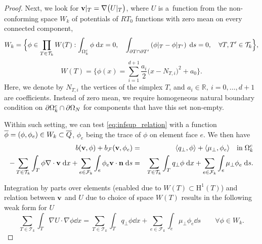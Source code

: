 {\begin{proof}
Next, we look for $\mathbf{v}|_T = \nabla \big(U|_T\big)$, where $U$ is a~function  
from the non-conforming space $W_k$ of potentials of $RT_{0}$ functions with 
zero mean on every connected component,
\begin{equation*}
  W_k =\Big\{\phi\in \prod_{T\in \mathcal{T}_k} W(T) : 
    \int_{\Omega^c_k} \phi \; \mathrm{d} x =0,\quad
    \int_{\partial T \cap \partial T'} 
    \left( \phi|_{T} - \phi|_{T'}\right) \; \mathrm{d} s = 0,\quad \forall 
T,T'\in\mathcal{T}_k\Big\}, 
\end{equation*}
\begin{equation*}
  W(T)=\Big\{\phi(x) = \sum_{i=1}^{d+1} 
    \frac{a_i}{2} \big(x - N_{T,i}\big)^2 + a_0\Big\}.  
\end{equation*}
Here, we denote by $N_{T,i}$ the vertices of the simplex $T$, and $a_i \in \mathbb{R},\ i = 0,\dots,d+1$ are coefficients. 
Instead of zero mean, we require homogeneous natural boundary condition on 
$\partial \Omega^c_k \cap \partial \Omega_{N}$ for components that have this 
set non-empty.

Within such setting, we can test \eqref{eq:infsup_relation} with a function 
$\overline\phi = (\phi, \phi_e) \in W_k \subset \overline Q$, $\phi_e$ being the trace of $\phi$ on element face $e$.
We then have
\begin{eqnarray}
    b(\mathbf{v}, \phi) + b_{\mathcal{F}}(\mathbf{v}, \phi_e) &=& \langle q_\bot, \phi \rangle 
        + \langle \mu_\bot, \phi_e \rangle  \quad \mathrm{in}\;\Omega^c_k \nonumber\\
    -\sum_{T\in\mathcal{T}_k} \int_T \phi \nabla\cdot \mathbf{v} \; \mathrm{d} x 
    + \sum_{e\in\mathcal{F}_k} \int_e \phi_e \mathbf{v} \cdot \mathbf{n} \; \mathrm{d} s &=&
    \sum_{T\in\mathcal{T}_k} \int_T q_\bot \phi \; \mathrm{d} x 
    + \sum_{e\in\mathcal{F}_k} \int_e \mu_\bot \phi_e \; \mathrm{d} s. \label{eq:infsup_weakform1}
\end{eqnarray}%

Integration by parts over elements (enabled due to $W(T)\subset\mathrm{H}^1(T)$) 
and relation between $\mathbf{v}$ and $U$ due to choice of space $W(T)$
results in the following weak form for $U$
\begin{equation} \label{eq:infsup_weakform2}
 \sum_{T\in \mathcal{T}_k} \int_{T} \nabla U \cdot \nabla \phi \dd x = 
\sum_{T\in \mathcal{T}_k} \int_{T} q_\bot \phi \dd x + 
\sum_{e\in \mathcal{F}_k} \int_{e} \mu_\bot \phi_e \dd s \qquad 
\forall \phi\in W_k. 
\end{equation}


\end{proof}}
